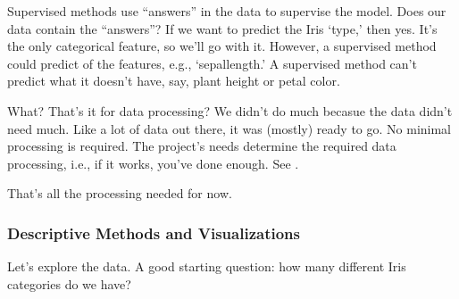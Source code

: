\documentclass[letterpaper,10pt,english]{jupyterBook}
\begin{document}
\sphinxAtStartPar
Supervised methods use “answers” in the data to supervise the model. Does our data contain the “answers”? If we want to predict the Iris ‘type,’ then yes. It’s the only categorical feature, so we’ll go with it. However, a supervised method could predict  of the features, e.g., ‘sepal\sphinxhyphen{}length.’ A supervised method can’t predict what it doesn’t have, say, plant height or petal color.

\begin{sphinxShadowBox}
\sphinxstylesidebartitle{}

\sphinxAtStartPar
What? That’s it for data processing? We didn’t do much becasue the data didn’t need much. Like a lot of data out there, it was (mostly) ready to go. No minimal processing is required. The project’s needs determine the required data processing, i.e., if it works, you’ve done enough. See {\hyperref[\detokenize{task2_c/task2_part_c:task2c-data-requirements}]{}}.
\end{sphinxShadowBox}

\sphinxAtStartPar
That’s all the processing needed for now.


\subsubsection{Descriptive Methods and Visualizations}
\label{\detokenize{task2_c/example_sup_class/sup_class_ex-process:descriptive-methods-and-visualizations}}\label{\detokenize{task2_c/example_sup_class/sup_class_ex-process:sup-class-ex-descriptive-methods-and-visualizations}}
\sphinxAtStartPar
Let’s explore the data. A good starting question: how many different Iris categories do we have?
\end{document}
